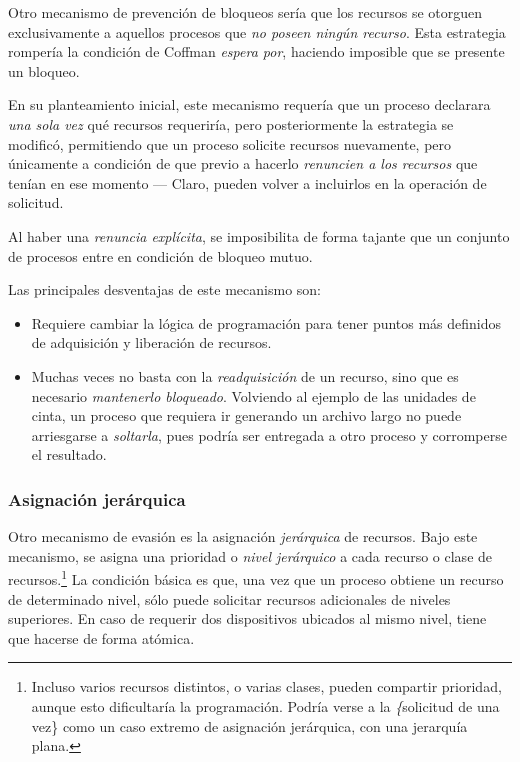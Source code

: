 \documentclass[11pt,fleqn]{book} %
\begin{document}
Otro mecanismo de prevención de bloqueos sería que los recursos se
otorguen exclusivamente a aquellos procesos que \emph{no poseen ningún recurso}. Esta estrategia rompería la condición de Coffman \emph{espera por}, haciendo imposible que se presente un bloqueo.

En su planteamiento inicial, este mecanismo requería que un proceso
declarara \emph{una sola vez} qué recursos requeriría, pero posteriormente
la estrategia se modificó, permitiendo que un proceso solicite
recursos nuevamente, pero únicamente a condición de que previo a
hacerlo \emph{renuncien a los recursos} que tenían en ese momento —
Claro, pueden volver a incluirlos en la operación de solicitud.

Al haber una \emph{renuncia explícita}, se imposibilita de forma tajante
que un conjunto de procesos entre en condición de bloqueo mutuo.

Las principales desventajas de este mecanismo son:

\begin{itemize}
\item Requiere cambiar la lógica de programación para tener puntos más
  definidos de adquisición y liberación de recursos.
\item Muchas veces no basta con la \emph{readquisición} de un recurso, sino
  que es necesario \emph{mantenerlo bloqueado}. Volviendo al ejemplo de
  las unidades de cinta, un proceso que requiera ir generando un
  archivo largo no puede arriesgarse a \emph{soltarla}, pues podría ser
  entregada a otro proceso y corromperse el resultado.
\end{itemize}
\subsubsection{Asignación jerárquica}
\label{sec-3-4-1-4}


Otro mecanismo de evasión es la asignación \emph{jerárquica} de
recursos. Bajo este mecanismo, se asigna una prioridad o \emph{nivel jerárquico} a cada recurso o clase de recursos.\footnote{Incluso varios
recursos distintos, o varias clases, pueden compartir prioridad,
aunque esto dificultaría la programación. Podría verse a la \emph\{solicitud
de una vez\} como un caso extremo de asignación jerárquica, con una
jerarquía plana. } La condición básica es que, una vez que un proceso
obtiene un recurso de determinado nivel, sólo puede solicitar recursos
adicionales de niveles superiores. En caso de requerir dos
dispositivos ubicados al mismo nivel, tiene que hacerse de forma
atómica.
\end{document}
